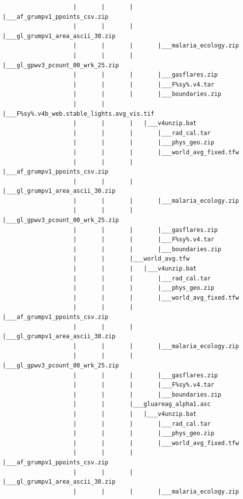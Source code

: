 \documentclass[]{book}
\begin{document}
\begin{verbatim}
                    |       |       |       |___af_grumpv1_ppoints_csv.zip
                    |       |       |       |___gl_grumpv1_area_ascii_30.zip
                    |       |       |       |___malaria_ecology.zip
                    |       |       |       |___gl_gpwv3_pcount_00_wrk_25.zip
                    |       |       |       |___gasflares.zip
                    |       |       |       |___F%sy%.v4.tar
                    |       |       |       |___boundaries.zip
                    |       |       |___F%sy%.v4b_web.stable_lights.avg_vis.tif
                    |       |       |   |___v4unzip.bat
                    |       |       |       |___rad_cal.tar
                    |       |       |       |___phys_geo.zip
                    |       |       |       |___world_avg_fixed.tfw
                    |       |       |       |___af_grumpv1_ppoints_csv.zip
                    |       |       |       |___gl_grumpv1_area_ascii_30.zip
                    |       |       |       |___malaria_ecology.zip
                    |       |       |       |___gl_gpwv3_pcount_00_wrk_25.zip
                    |       |       |       |___gasflares.zip
                    |       |       |       |___F%sy%.v4.tar
                    |       |       |       |___boundaries.zip
                    |       |       |___world_avg.tfw
                    |       |       |   |___v4unzip.bat
                    |       |       |       |___rad_cal.tar
                    |       |       |       |___phys_geo.zip
                    |       |       |       |___world_avg_fixed.tfw
                    |       |       |       |___af_grumpv1_ppoints_csv.zip
                    |       |       |       |___gl_grumpv1_area_ascii_30.zip
                    |       |       |       |___malaria_ecology.zip
                    |       |       |       |___gl_gpwv3_pcount_00_wrk_25.zip
                    |       |       |       |___gasflares.zip
                    |       |       |       |___F%sy%.v4.tar
                    |       |       |       |___boundaries.zip
                    |       |       |___gluareag_alpha1.asc
                    |       |       |   |___v4unzip.bat
                    |       |       |       |___rad_cal.tar
                    |       |       |       |___phys_geo.zip
                    |       |       |       |___world_avg_fixed.tfw
                    |       |       |       |___af_grumpv1_ppoints_csv.zip
                    |       |       |       |___gl_grumpv1_area_ascii_30.zip
                    |       |       |       |___malaria_ecology.zip

\end{verbatim}
\end{document}
